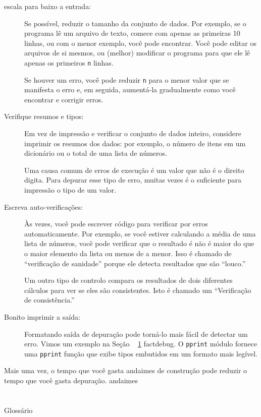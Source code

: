 \documentclass[10pt]{book}
\begin{document}
\begin{exercise}
\begin{v erbatim}
\begin{description}
\item[escala para baixo a entrada:] Se possível, reduzir o tamanho da
conjunto de dados. Por exemplo, se o programa lê um arquivo de texto, comece com
apenas as primeiras 10 linhas, ou com o menor exemplo, você pode encontrar.
Você pode editar os arquivos de si mesmos, ou (melhor) modificar o
programa para que ele lê apenas os primeiros {\tt n} linhas.

Se houver um erro, você pode reduzir {\tt n} para o menor
valor que se manifesta o erro e, em seguida, aumentá-la gradualmente
como você encontrar e corrigir erros.

\item[Verifique resumos e tipos:] Em vez de impressão e verificar o
conjunto de dados inteiro, considere imprimir os resumos dos dados: por exemplo,
o número de itens em um dicionário ou o total de uma lista de números.

Uma causa comum de erros de execução é um valor que não é o direito
digita. Para depurar esse tipo de erro, muitas vezes é o suficiente para impressão
o tipo de um valor.

\item[Escreva auto-verificações:] Às vezes, você pode escrever código para verificar
por erros automaticamente. Por exemplo, se você estiver calculando a
média de uma lista de números, você pode verificar que o resultado é
não é maior do que o maior elemento da lista ou menos de
a menor. Isso é chamado de ``verificação de sanidade'' porque ele detecta
resultados que são ``louco.''

Um outro tipo de controlo compara os resultados de dois diferentes
cálculos para ver se eles são consistentes. Isto é chamado um
``Verificação de consistência.''

\item[Bonito imprimir a saída:] Formatando saída de depuração
pode torná-lo mais fácil de detectar um erro. Vimos um exemplo na
Seção ~ \ref {} factdebug. O {\tt pprint} módulo fornece
uma {\tt pprint} função que exibe tipos embutidos em
um formato mais legível.

\end{description}

Mais uma vez, o tempo que você gasta andaimes de construção pode reduzir
o tempo que você gasta depuração.
\index{} andaimes

\section{} Glossário


\end{v erbatim}
\end{exercise}
\end{document}
